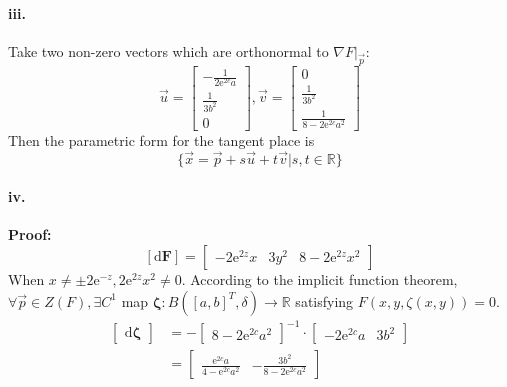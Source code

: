 \documentclass[11pt, a4paper]{article}
\begin{document}
\paragraph{iii.}
Take two non-zero vectors which are orthonormal to $\nabla F|_{\vec{p}}$:
$$\vec{u} = 
\begin{bmatrix}
    -\frac{1}{2\mathrm{e}^{2c}a} \\
    \frac{1}{3b^2} \\
    0
\end{bmatrix}, \vec{v} = 
\begin{bmatrix}
    0 \\
    \frac{1}{3b^2} \\
    \frac{1}{8 - 2\mathrm{e}^{2c}a^2}
\end{bmatrix}$$
Then the parametric form for the tangent place is
$$\{\vec{x} = \vec{p} + s\vec{u} + t\vec{v} | s, t \in \mathbb{R}\}$$
\paragraph{iv.} 
\textbf{Proof:}
$$[\mathrm{d}\bm{F}] = 
\begin{bmatrix}
    -2\mathrm{e}^{2z}x & 3y^2 & 8 - 2\mathrm{e}^{2z}x^2
\end{bmatrix}$$
When $x \neq \pm 2\mathrm{e}^{-z}, 2\mathrm{e}^{2z}x^2 \neq 0$. According to the implicit function theorem, $\forall \vec{p} \in Z(F), \exists C^1$ map $\bm{\zeta}: B([a, b]^T, \delta) \to \mathbb{R}$ satisfying $F(x, y, \zeta(x, y)) = 0$.
$$\begin{aligned}
    \begin{bmatrix}
        \mathrm{d}\bm{\zeta}
    \end{bmatrix} &= -
    \begin{bmatrix}
        8 - 2\mathrm{e}^{2c}a^2
    \end{bmatrix}^{-1} \cdot 
    \begin{bmatrix}
        -2\mathrm{e}^{2c}a & 3b^2
    \end{bmatrix} \\
    &=
    \begin{bmatrix}
        \frac{\mathrm{e}^{2c}a}{4 - \mathrm{e}^{2c}a^2} & -\frac{3b^2}{8 - 2\mathrm{e}^{2c}a^2}
    \end{bmatrix}
\end{aligned}$$
\end{document}
